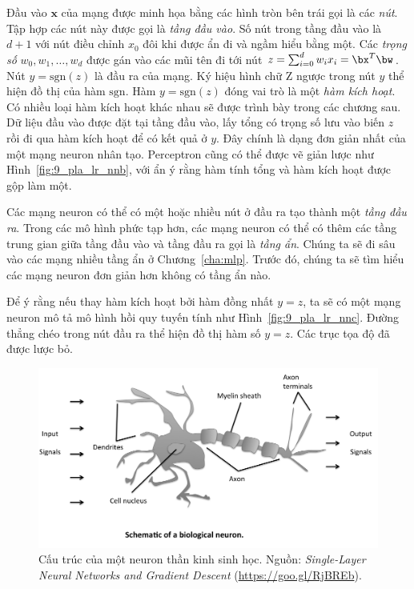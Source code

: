 Đầu vào $\mathbf{x}$ của mạng được minh họa bằng các hình tròn bên trái gọi là
các \textit{nút}. Tập hợp các nút này được gọi là \textit{tầng đầu vào}. Số nút
trong tầng đầu vào là $d + 1$ với nút điều chỉnh $x_0$ đôi khi được ẩn đi và ngầm hiểu  bằng một. Các \textit{trọng số} $w_0, w_1, \dots, w_d$ được gán vào các mũi
tên đi tới nút $ z = \sum_{i=0}^dw_ix_i =
\bx^T\bw$. Nút $y = \text{sgn}(z)$ là đầu ra của
mạng. Ký hiệu hình chữ Z ngược trong nút $y$ thể hiện đồ thị của hàm
$\text{sgn}$. Hàm $y = \text{sgn}(z)$ đóng vai trò là một \textit{hàm kích
hoạt}. Có nhiều loại hàm kích hoạt khác nhau sẽ được trình bày trong các chương sau. Dữ liệu đầu vào được đặt tại tầng đầu vào, lấy tổng có trọng số lưu vào
biến $z$ rồi đi qua hàm kích hoạt để có kết quả ở $y$. Đây chính là dạng đơn
giản nhất của một mạng neuron nhân tạo. Perceptron cũng có thể được vẽ giản lược
như Hình~\ref{fig:9_pla_lr_nnb}, với ẩn ý rằng hàm tính tổng và hàm kích hoạt
được gộp làm một.
 
Các mạng neuron có thể có một hoặc nhiều nút ở đầu ra tạo thành một \textit{tầng
đầu ra}. Trong các mô hình phức tạp hơn, các mạng neuron có thể có thêm các tầng
trung gian giữa tầng đầu vào và tầng đầu ra gọi là \textit{tầng ẩn}. Chúng
ta sẽ đi sâu vào các mạng nhiều tầng ẩn ở Chương~\ref{cha:mlp}. Trước đó, chúng
ta sẽ tìm hiểu các mạng neuron đơn giản hơn không có tầng ẩn nào.

 
Để ý rằng nếu thay hàm kích hoạt bởi hàm đồng nhất $y = z$, ta sẽ có một mạng neuron mô tả mô hình hồi quy tuyến tính như Hình~\ref{fig:9_pla_lr_nnc}.
Đường thẳng chéo trong nút đầu ra thể hiện đồ thị hàm số $y = z$. Các trục tọa độ đã
được lược bỏ.
 


\begin{figure}[t]
 \centering
     \includegraphics[width = \textwidth]{Chapters/05_NeuralNetworks/09_perceptron/perceptron_neuron_gray.png}
     \caption{ 
    Cấu trúc của một neuron thần kinh sinh học. Nguồn: \textit{Single-Layer Neural Networks and Gradient Descent} (\url{https://goo.gl/RjBREb}).
    }
     \label{fig:9_per_nn}
 \end{figure} 


